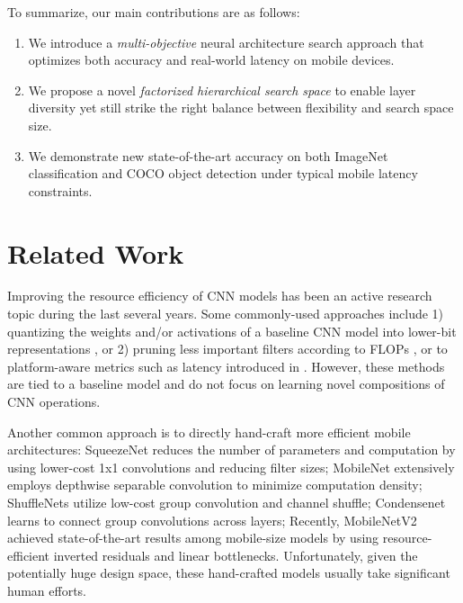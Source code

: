 \documentclass[10pt,twocolumn,letterpaper]{article}
\begin{document}
To summarize, our main contributions are as follows:

\begin{enumerate}
	\item We introduce a \emph{multi-objective}  neural architecture search approach that optimizes both accuracy and real-world latency on mobile devices.
	
	\item We propose a novel \emph{factorized hierarchical search space} to enable layer diversity yet still strike the right balance between  flexibility and search space size.
	
	\item We demonstrate new state-of-the-art accuracy on both ImageNet classification and COCO object detection under typical mobile latency constraints.
\end{enumerate} %
\section{Related Work}
\label{sec:related}


Improving the resource efficiency of CNN models has been an active research topic during the last several years. Some commonly-used approaches include 1) quantizing the weights and/or activations of a baseline CNN model into lower-bit representations \cite{quantize15,fackequantize18}, or 2)  pruning less important filters according to FLOPs  \cite{morphnet18,amc18}, or to platform-aware metrics such as latency introduced in \cite{netadapt18}. However, these methods are tied to a baseline model and do not focus on learning novel compositions of CNN operations. 

Another common approach is to directly hand-craft more efficient mobile architectures: SqueezeNet \cite{squeezenet16} reduces the number of parameters and computation by using lower-cost 1x1 convolutions and reducing filter sizes; MobileNet \cite{mobilenetv117} extensively employs depthwise separable convolution to minimize computation density; ShuffleNets \cite{shufflenet17, shufflenetv218} utilize low-cost group convolution and channel shuffle; Condensenet \cite{condensenet18} learns to connect group convolutions across layers; Recently, MobileNetV2 \cite{mobilenetv218} achieved state-of-the-art results among mobile-size models by using resource-efficient inverted residuals and linear bottlenecks. Unfortunately, given the potentially huge design space, these hand-crafted models usually take significant human efforts.
\end{document}

